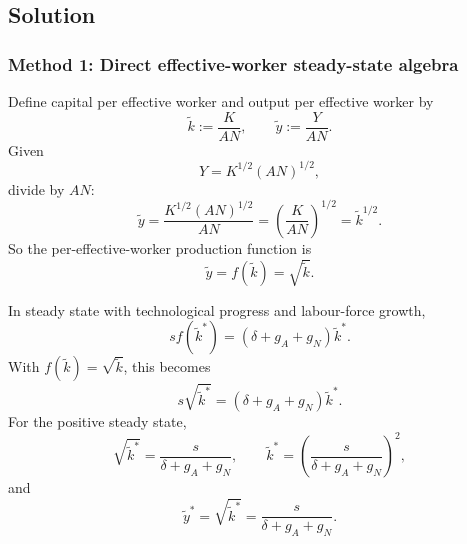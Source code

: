 \documentclass[12pt]{article}
\begin{document}
\newpage
\subsection{Solution}

\subsubsection{Method 1: Direct effective-worker steady-state algebra}
Define capital per effective worker and output per effective worker by
\[
\tilde{k}:=\frac{K}{AN},
\qquad
\tilde{y}:=\frac{Y}{AN}.
\]
Given
\[
Y=K^{1/2}(AN)^{1/2},
\]
divide by \(AN\):
\[
\tilde{y}
=
\frac{K^{1/2}(AN)^{1/2}}{AN}
=
\left(\frac{K}{AN}\right)^{1/2}
=
\tilde{k}^{1/2}.
\]
So the per-effective-worker production function is
\[
\tilde{y}=f(\tilde{k})=\sqrt{\tilde{k}}.
\]

In steady state with technological progress and labour-force growth,
\[
s f(\tilde{k}^*)=(\delta+g_A+g_N)\tilde{k}^*.
\]
With \(f(\tilde{k})=\sqrt{\tilde{k}}\), this becomes
\[
s\sqrt{\tilde{k}^*}=(\delta+g_A+g_N)\tilde{k}^*.
\]
For the positive steady state,
\[
\sqrt{\tilde{k}^*}=\frac{s}{\delta+g_A+g_N},
\qquad
\tilde{k}^*=\left(\frac{s}{\delta+g_A+g_N}\right)^2,
\]
and
\[
\tilde{y}^*=\sqrt{\tilde{k}^*}=\frac{s}{\delta+g_A+g_N}.
\]
\end{document}
